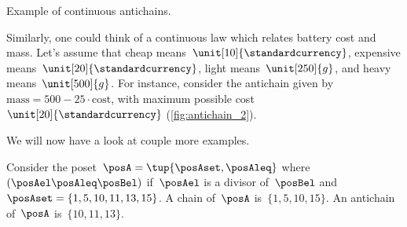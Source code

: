 %
\begin{marginfigure}
	\centering
	\caption{Example of continuous antichains.}
	\label{fig:antichain_2}
\end{marginfigure}

Similarly, one could think of a continuous law which relates battery cost and mass.
Let's assume that cheap means~$\unit[10]{\standardcurrency}$, expensive means~$\unit[20]{\standardcurrency}$, light means~$\unit[250]{g}$, and heavy means~$\unit[500]{g}$.
For instance, consider the antichain given by~$\text{mass}=500-25\cdot \text{cost}$, with maximum possible cost~$\unit[20]{\standardcurrency}$ (\cref{fig:antichain_2}).

We will now have a look at couple more examples.
\begin{example}
	Consider the poset~$\posA=\tup{\posAset,\posAleq}$ where~$(\posAel \posAleq \posBel)$ if~$\posAel$ is a divisor of~$\posBel$ and~$\posAset=\{1,5,10,11,13,15\}$.
	A chain of~$\posA$ is~$\{1,5,10,15\}$.
	An antichain of~$\posA$ is~$\{10,11,13\}$.
\end{example}

